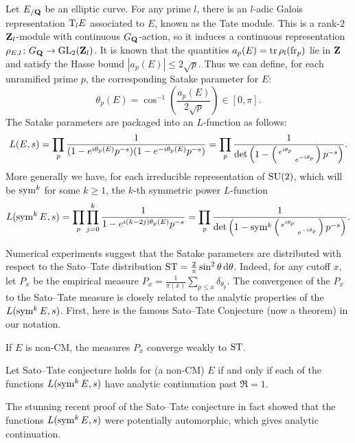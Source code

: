 Let $E_{/\mathbf{Q}}$ be an elliptic curve. For any prime $l$, there is an 
$l$-adic Galois representation $\mathrm{T}_l E$ associated to $E$, known as the 
Tate module. This is a rank-$2$ $\mathbf{Z}_l$-module with continuous $G_{\mathbf{Q}}$-action, 
so it induces a continuous representation 
$\rho_{E,l} \colon G_{\mathbf{Q}} \to \operatorname{GL}_2(\mathbf{Z}_l)$. It is known that the quantities 
$a_p(E) = \operatorname{tr} \rho_l(\mathrm{fr}_p)$ lie in $\mathbf{Z}$ and satisfy the Hasse bound 
$|a_p(E)| \leqslant 2\sqrt p$. Thus we can define, for each unramified prime 
$p$, the corresponding Satake parameter for $E$: 
\[
	\theta_p(E) = \cos^{-1}\left(\frac{a_p(E)}{2\sqrt p}\right) \in [0,\pi] .
\]
The Satake parameters are packaged into an $L$-function as follows:
\[
	L(E,s) = \prod_p \frac{1}{(1 - e^{i \theta_p(E)} p^{-s})(1- e^{-i \theta_p(E)} p^{-s})} = \prod_p \frac{1}{\det\left(1 - \left(\begin{smallmatrix} e^{i\theta_p} &  \\  & e^{-i \theta_p} \end{smallmatrix}\right)p^{-s}\right)}.
\]
More generally we have, for each irreducible representation of $\operatorname{SU}(2)$, which 
will be $\operatorname{sym}^k$ for some $k\geqslant 1$, the $k$-th symmetric power 
$L$-function 
\[
	L(\operatorname{sym}^k E, s) = \prod_p \prod_{j=0}^k \frac{1}{1 - e^{i (k - 2j) \theta_p(E)} p^{-s}} = \prod_p \frac{1}{\det\left(1-\operatorname{sym}^k \left(\begin{smallmatrix} e^{i\theta_p} &  \\  & e^{-i \theta_p} \end{smallmatrix}\right)p^{-s}\right)}.
\]

Numerical experiments suggest that the Satake parameters are distributed with 
respect to the Sato--Tate distribution 
$\mathrm{ST} = \frac{2}{\pi} \sin^2\theta\, \mathrm{d}\theta$. Indeed, for any cutoff $x$, let 
$P_x$ be the empirical measure 
$P_x = \frac{1}{\pi(x)} \sum_{p\leqslant x} \delta_{\theta_p}$. 
The convergence of the $P_x$ to the Sato--Tate measure is closely related to 
the analytic properties of the $L(\operatorname{sym}^k E,s)$. First, here is the famous 
Sato--Tate Conjecture (now a theorem) in our notation. 

\begin{theorem}[Taylor et.~al.]
If $E$ is non-CM, the measures $P_x$ converge weakly to $\mathrm{ST}$. 
\end{theorem}

\begin{theorem}
Let Sato--Tate conjecture holds for (a non-CM) $E$ if and only if each of 
the functions $L(\operatorname{sym}^k E,s)$ have analytic continuation past $\Re = 1$. 
\end{theorem}

The stunning recent proof of the Sato--Tate conjecture 
\cite{clozel-harris-taylor-2008,taylor-2008,harris-shepherd-barron-taylor-2010} 
in fact showed that the functions $L(\operatorname{sym}^k E,s)$ were potentially automorphic, 
which gives analytic continuation. 


